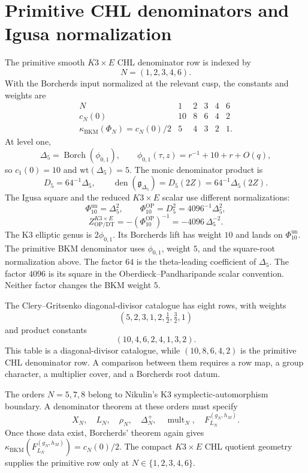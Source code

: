 \documentclass[10pt]{article}
\providecommand{\kBKM}{\kappa_{\mathrm{BKM}}}
\providecommand{\gDelta}{\mathfrak{g}_{\Delta_5}}
\begin{document}
\section*{Primitive CHL denominators and Igusa normalization}

The primitive smooth \(K3\times E\) CHL denominator row is indexed by
\[
        N=(1,2,3,4,6).
\]
With the Borcherds input normalized at the relevant cusp, the constants
and weights are
\[
\begin{array}{c|ccccc}
N & 1 & 2 & 3 & 4 & 6\\
\hline
c_N(0) & 10 & 8 & 6 & 4 & 2\\
\kBKM(\Phi_N)=c_N(0)/2 & 5 & 4 & 3 & 2 & 1 .
\end{array}
\]
At level one,
\[
        \Delta_5=\operatorname{Borch}(\phi_{0,1}),\qquad
        \phi_{0,1}(\tau,z)=r^{-1}+10+r+O(q),
\]
so \(c_1(0)=10\) and \(\mathrm{wt}(\Delta_5)=5\).  The monic
denominator product is
\[
        D_5=64^{-1}\Delta_5,\qquad
        \operatorname{den}(\gDelta)=D_5(2Z)=64^{-1}\Delta_5(2Z).
\]
The Igusa square and the reduced \(K3\times E\) scalar use different
normalizations:
\[
        \Phi_{10}^{\mathrm{un}}=\Delta_5^2,\qquad
        \Phi_{10}^{\mathrm{OP}}=D_5^2=4096^{-1}\Delta_5^2,
\]
\[
        Z^{K3\times E}_{\mathrm{OP/DT}}
        =-(\Phi_{10}^{\mathrm{OP}})^{-1}
        =-4096\,\Delta_5^{-2}.
\]
The K3 elliptic genus is \(2\phi_{0,1}\).  Its Borcherds lift has
weight \(10\) and lands on \(\Phi_{10}^{\mathrm{un}}\).  The primitive
BKM denominator uses \(\phi_{0,1}\), weight \(5\), and the square-root
normalization above.
The factor \(64\) is the theta-leading coefficient of \(\Delta_5\).
The factor \(4096\) is its square in the Oberdieck--Pandharipande
scalar convention.  Neither factor changes the BKM weight \(5\).

The Clery--Gritsenko diagonal-divisor catalogue has eight rows, with
weights
\[
        (5,2,3,1,2,\tfrac12,\tfrac32,1)
\]
and product constants
\[
        (10,4,6,2,4,1,3,2).
\]
This table is a diagonal-divisor catalogue, while
\((10,8,6,4,2)\) is the primitive CHL denominator row.  A comparison
between them requires a row map, a group character, a multiplier cover,
and a Borcherds root datum.

The orders \(N=5,7,8\) belong to Nikulin's K3 symplectic-automorphism
boundary.  A denominator theorem at these orders must specify
\[
        X_N,\quad L_N,\quad \rho_N,\quad
        \Delta_N^+,\quad \operatorname{mult}_N,\quad
        F^{(g_N,h_M)}_{L_N}.
\]
Once those data exist, Borcherds' theorem again gives
\(\kBKM(F^{(g_N,h_M)}_{L_N})=c_N(0)/2\).  The compact
\(K3\times E\) CHL quotient geometry supplies the primitive row only at
\(N\in\{1,2,3,4,6\}\).
\end{document}
